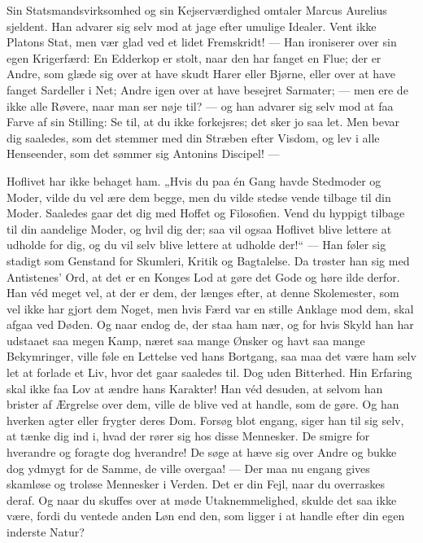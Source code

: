 \documentclass[12pt,a4paper,openany]{book}
\newcommand{\opage}[1]{\marginnote{\footnotesize\textit{[#1]}}}
\begin{document}
Sin Statsmandsvirksomhed og sin Kejserværdighed omtaler
Marcus Aurelius sjeldent. Han advarer sig selv mod at jage
efter umulige Idealer. Vent ikke Platons Stat, men vær glad
ved et lidet Fremskridt! --- Han ironiserer over sin egen Krigerfærd:
En Edderkop er stolt, naar den har fanget en Flue;
der er Andre, som glæde sig over at have skudt Harer eller
Bjørne, eller over at have fanget Sardeller i Net; Andre igen
over at have besejret Sarmater; --- men ere de ikke alle Røvere,
naar man ser nøje til? --- og han advarer sig selv mod
at faa Farve af sin Stilling: Se til, at du ikke forkejsres; det
sker jo saa let. Men bevar dig saaledes, som det stemmer
\setcounter{footnote}{0}%
\opage{112}med din Stræben efter Visdom, og lev i alle Henseender, som
det sømmer sig Antonins Discipel! ---

Hoflivet har ikke behaget ham. „Hvis du paa én Gang
havde Stedmoder og Moder, vilde du vel ære dem begge, men
du vilde stedse vende tilbage til din Moder. Saaledes gaar
det dig med Hoffet og Filosofien. Vend du hyppigt tilbage til din
aandelige Moder, og hvil dig der; saa vil ogsaa Hoflivet blive
lettere at udholde for dig, og du vil selv blive lettere at udholde
der!“ --- Han føler sig stadigt som Genstand for Skumleri,
Kritik og Bagtalelse. Da trøster han sig med Antistenes’
Ord, at det er en Konges Lod at gøre det Gode og høre ilde
derfor. Han véd meget vel, at der er dem, der længes efter,
at denne Skolemester, som vel ikke har gjort dem Noget, men
hvis Færd var en stille Anklage mod dem, skal afgaa ved
Døden. Og naar endog de, der staa ham nær, og for hvis Skyld
han har udstaaet saa megen Kamp, næret saa mange Ønsker
og havt saa mange Bekymringer, ville føle en Lettelse ved
hans Bortgang, saa maa det være ham selv let at forlade et
Liv, hvor det gaar saaledes til. Dog uden Bitterhed. Hin
Erfaring skal ikke faa Lov at ændre hans Karakter! Han véd
desuden, at selvom han brister af Ærgrelse over dem, ville de
blive ved at handle, som de gøre. Og han hverken agter eller
frygter deres Dom. Forsøg blot engang, siger han til sig selv,
at tænke dig ind i, hvad der rører sig hos disse Mennesker.
De smigre for hverandre og foragte dog hverandre! De søge
at hæve sig over Andre og bukke dog ydmygt for de Samme,
de ville overgaa! --- Der maa nu engang gives skamløse og
troløse Mennesker i Verden. Det er din Fejl, naar du overraskes
deraf. Og naar du skuffes over at møde Utaknemmelighed,
skulde det saa ikke være, fordi du ventede anden Løn
end den, som ligger i at handle efter din egen inderste Natur?
\end{document}
